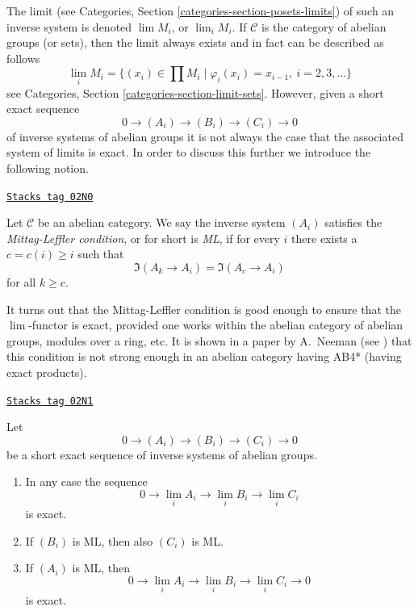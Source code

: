 The limit (see Categories, Section \ref{categories-section-posets-limits})
of such an inverse system is denoted $\lim M_i$, or $\lim_i M_i$.
If $\mathcal{C}$ is the category of abelian groups (or sets), then the limit
always exists and in fact can be described as follows
$$
\lim_i M_i
=
\{(x_i) \in \prod M_i \mid \varphi_i(x_i) = x_{i - 1}, \ i = 2, 3, \ldots\}
$$
see Categories, Section \ref{categories-section-limit-sets}.
However, given a short exact sequence
$$
0 \to (A_i) \to (B_i) \to (C_i) \to 0
$$
of inverse systems of abelian groups it is not always the case
that the associated system of limits is exact. In order to discuss
this further we introduce the following notion.

\begin{definition}
\label{homology-definition-Mittag-Leffler}
\href{https://stacks.math.columbia.edu/tag/02N0}{\texttt{Stacks tag 02N0}}

Let $\mathcal{C}$ be an abelian category.
We say the inverse system $(A_i)$
satisfies the {\it Mittag-Leffler condition}, or for short
is {\it ML}, if for every $i$ there exists a $c = c(i) \geq i$
such that
$$
\Im(A_k \to A_i) = \Im(A_c \to A_i)
$$
for all $k \geq c$.
\end{definition}

It turns out that the Mittag-Leffler condition is good enough to ensure
that the $\lim$-functor is exact, provided one works within
the abelian category of abelian groups, modules over a ring, etc.
It is shown in a paper by A.\ Neeman (see \cite{Neeman-Counterexample})
that this condition is not strong enough in an abelian
category having AB4* (having exact products).

\begin{lemma}
\label{homology-lemma-Mittag-Leffler}
\href{https://stacks.math.columbia.edu/tag/02N1}{\texttt{Stacks tag 02N1}}

Let
$$
0 \to (A_i) \to (B_i) \to (C_i) \to 0
$$
be a short exact sequence of inverse systems of abelian groups.
\begin{enumerate}
\item In any case the sequence
$$
0 \to \lim_i A_i \to \lim_i B_i \to \lim_i C_i
$$
is exact.
\item If $(B_i)$ is ML, then also $(C_i)$ is ML.
\item If $(A_i)$ is ML, then
$$
0 \to \lim_i A_i \to \lim_i B_i \to \lim_i C_i \to 0
$$
is exact.
\end{enumerate}
\end{lemma}

